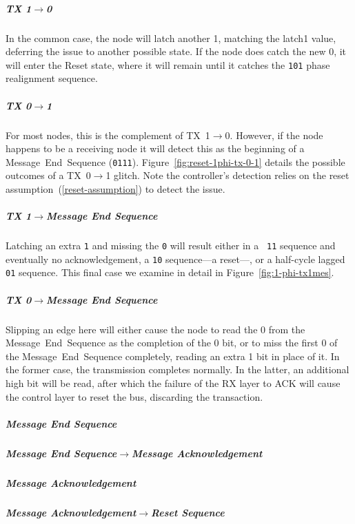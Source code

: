 \subparagraph{TX 1$\rightarrow$0}
In the common case, the node will latch another 1, matching the {\sc latch1}
value, deferring the issue to another possible state. If the node does catch
the new 0, it will enter the Reset state, where it will remain until it
catches the {\tt 101} phase realignment sequence.

\subparagraph{TX 0$\rightarrow$1}
\label{reset-phi1-tx-0-1}
For most nodes, this is the complement of TX~1$\rightarrow$0. However, if the
node happens to be a receiving node it will detect this as the beginning of a
Message~End~Sequence ({\tt 0111}). Figure~\ref{fig:reset-1phi-tx-0-1} details
the possible outcomes of a TX~0$\rightarrow$1 glitch.  Note the controller's
detection relies on the reset assumption~(\ref{reset-assumption}) to detect
the issue.

\subparagraph{TX 1$\rightarrow$Message End Sequence}
Latching an extra {\tt 1} and missing the {\tt 0} will result either in a {\tt
11} sequence and eventually no acknowledgement, a {\tt 10} sequence---a
reset---, or a half-cycle lagged {\tt 01} sequence. This final case we examine
in detail in Figure~\ref{fig:1-phi-tx1mes}.

\subparagraph{TX 0$\rightarrow$Message End Sequence}
Slipping an edge here will either cause the node to read the 0 from the
Message~End~Sequence as the completion of the 0 bit, or to miss the first 0 of
the Message~End~Sequence completely, reading an extra 1 bit in place of it. In
the former case, the transmission completes normally. In the latter, an
additional high bit will be read, after which the failure of the RX layer to
ACK will cause the control layer to reset the bus, discarding the transaction.

\subparagraph{Message End Sequence}

\subparagraph{Message End Sequence$\rightarrow$Message Acknowledgement}

\subparagraph{Message Acknowledgement}

\subparagraph{Message Acknowledgement$\rightarrow$Reset Sequence}


